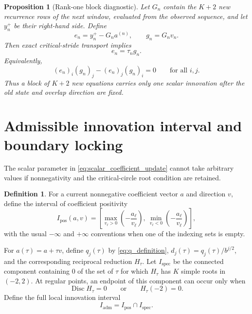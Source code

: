 \documentclass[11pt]{amsart}
\numberwithin{equation}{section}
\theoremstyle{plain}
\newtheorem{proposition}[theorem]{Proposition}
\theoremstyle{definition}
\newtheorem{definition}[theorem]{Definition}
\theoremstyle{remark}
\begin{document}
\begin{proposition}[Rank-one block diagnostic]
\label{prop:rank_one_block_diagnostic}
Let $G_n$ contain the $K+2$ new recurrence rows of the next window, evaluated from the observed sequence, and let $y_n^+$ be their right-hand side.  Define
\begin{equation}
e_n=y_n^+-G_na^{(n)},
\qquad
g_n=G_nv_n.
\label{eq:block_residual_vectors}
\end{equation}
Then exact critical-stride transport implies
\begin{equation}
e_n=\tau_ng_n.
\label{eq:block_collinearity}
\end{equation}
Equivalently,
\begin{equation}
(e_n)_i(g_n)_j-(e_n)_j(g_n)_i=0
\qquad
\text{for all }i,j.
\label{eq:block_minor_identities}
\end{equation}
Thus a block of $K+2$ new equations carries only one scalar innovation after the old state and overlap direction are fixed.
\end{proposition}

\section{Admissible innovation interval and boundary locking}
\label{sec:innovation_interval}

The scalar parameter in \eqref{eq:scalar_coefficient_update} cannot take arbitrary values if nonnegativity and the critical-circle root condition are retained.

\begin{definition}
\label{def:positive_tau_interval}
For a current nonnegative coefficient vector $a$ and direction $v$, define the interval of coefficient positivity
\begin{equation}
I_{\mathrm{pos}}(a,v)
=
\left[
\max_{v_\ell>0}\left(-\frac{a_\ell}{v_\ell}\right),
\ 
\min_{v_\ell<0}\left(-\frac{a_\ell}{v_\ell}\right)
\right],
\label{eq:positive_tau_interval}
\end{equation}
with the usual $-\infty$ and $+\infty$ conventions when one of the indexing sets is empty.
\end{definition}

For $a(\tau)=a+\tau v$, define $q_j(\tau)$ by \eqref{eq:q_definition}, $d_j(\tau)=q_j(\tau)/b^{j/2}$, and the corresponding reciprocal reduction $H_\tau$.  Let $I_{\mathrm{spec}}$ be the connected component containing $0$ of the set of $\tau$ for which $H_\tau$ has $K$ simple roots in $(-2,2)$.  At regular points, an endpoint of this component can occur only when
\begin{equation}
\operatorname{Disc}H_\tau=0
\qquad\text{or}\qquad
H_\tau(-2)=0.
\label{eq:tau_spectral_boundaries}
\end{equation}
Define the full local innovation interval
\begin{equation}
I_{\mathrm{adm}}=I_{\mathrm{pos}}\cap I_{\mathrm{spec}}.
\label{eq:admissible_tau_interval}
\end{equation}
\end{document}

